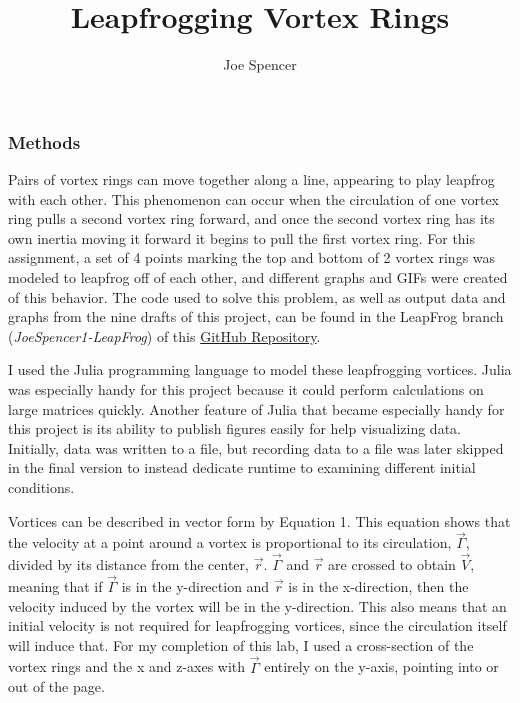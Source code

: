 \documentclass{article}
\begin{document}
\author{Joe Spencer}
\title{Leapfrogging Vortex Rings}
\date{}  %
\maketitle

\subsubsection*{Methods}
Pairs of vortex rings can move together along a line, appearing to play leapfrog with each other. This phenomenon can occur when the circulation of one vortex ring pulls a second vortex ring forward, and once the second vortex ring has its own inertia moving it forward it begins to pull the first vortex ring. For this assignment, a set of 4 points marking the top and bottom of 2 vortex rings was modeled to leapfrog off of each other, and different graphs and GIFs were created of this behavior. The code used to solve this problem, as well as output data and graphs from the nine drafts of this project, can be found in the LeapFrog branch (\emph{JoeSpencer1-LeapFrog}) of this \href{https://github.com/JoeSpencer1/497R-Projects.git}{GitHub Repository}. \newline

I used the Julia programming language to model these leapfrogging vortices. Julia was especially handy for this project because it could perform calculations on large matrices quickly. Another feature of Julia that became especially handy for this project is its ability to publish figures easily for help visualizing data. Initially, data was written to a file, but recording data to a file was later skipped in the final version to instead dedicate runtime to examining different initial conditions.\newline

Vortices can be described in vector form by Equation 1. This equation shows that the velocity at a point around a vortex is proportional to its circulation, $\vec{\Gamma}$, divided by its distance from the center, $\vec{r}$. $\vec{\Gamma}$ and $\vec{r}$ are crossed to obtain $\vec{V}$, meaning that if $\vec{\Gamma}$ is in the y-direction and $\vec{r}$ is in the x-direction, then the velocity induced by the vortex will be in the y-direction. This also means that an initial velocity is not required for leapfrogging vortices, since the circulation itself will induce that. For my completion of this lab, I used a cross-section of the vortex rings and the x and z-axes with $\vec{\Gamma}$ entirely on the y-axis, pointing into or out of the page.
\end{document}

